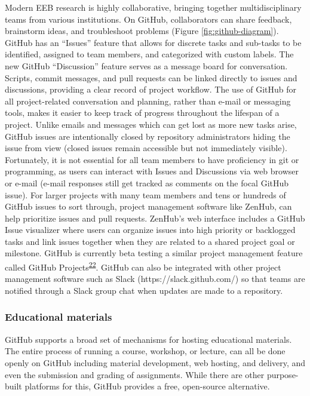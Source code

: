 Modern EEB research is highly collaborative, bringing together multidisciplinary teams from various institutions.
On GitHub, collaborators can share feedback, brainstorm ideas, and troubleshoot problems (Figure \ref{fig:github-diagram}).
GitHub has an ``Issues'' feature that allows for discrete tasks and sub-tasks to be identified, assigned to team members, and categorized with custom labels.
The new GitHub ``Discussion'' feature serves as a message board for conversation.
Scripts, commit messages, and pull requests can be linked directly to issues and discussions, providing a clear record of project workflow.
The use of GitHub for all project-related conversation and planning, rather than e-mail or messaging tools, makes it easier to keep track of progress throughout the lifespan of a project.
Unlike emails and messages which can get lost as more new tasks arise, GitHub issues are intentionally closed by repository administrators hiding the issue from view (closed issues remain accessible but not immediately visible).
Fortunately, it is not essential for all team members to have proficiency in git or programming, as users can interact with Issues and Discussions via web browser or e-mail (e-mail responses still get tracked as comments on the focal GitHub issue).
For larger projects with many team members and tens or hundreds of GitHub issues to sort through, project management software like ZenHub, can help prioritize issues and pull requests.
ZenHub's web interface includes a GitHub Issue visualizer where users can organize issues into high priority or backlogged tasks and link issues together when they are related to a shared project goal or milestone.
GitHub is currently beta testing a similar project management feature called GitHub Projects\textsuperscript{\protect\hyperlink{ref-RhBKe0MG}{22}}.
GitHub can also be integrated with other project management software such as Slack (https://slack.github.com/) so that teams are notified through a Slack group chat when updates are made to a repository.

\hypertarget{educational-materials}{%
\subsubsection{Educational materials}\label{educational-materials}}

GitHub supports a broad set of mechanisms for hosting educational materials.
The entire process of running a course, workshop, or lecture, can all be done openly on GitHub including material development, web hosting, and delivery, and even the submission and grading of assignments.
While there are other purpose-built platforms for this, GitHub provides a free, open-source alternative.

